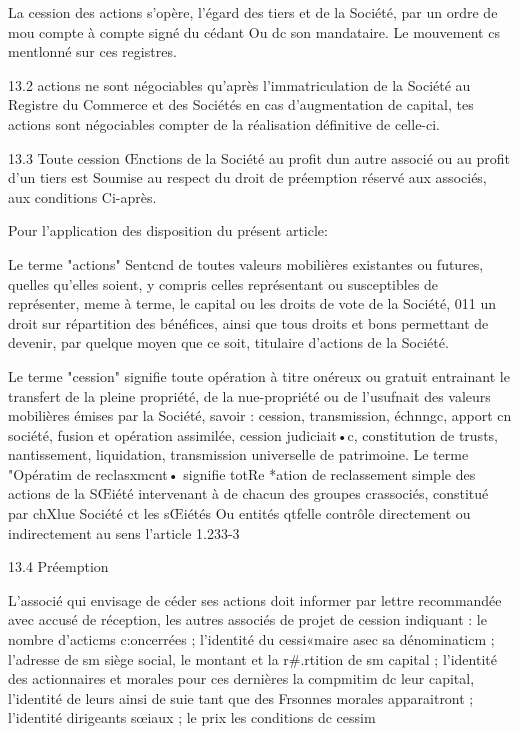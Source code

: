 \documentclass{article}
\begin{document}
La cession des actions s'opère, l'égard des tiers et de la Société, par un ordre de mou compte à compte signé du cédant Ou dc son mandataire. Le mouvement cs mentlonné sur ces registres.

13.2 actions ne sont négociables qu'après l'immatriculation de la Société au Registre du Commerce et des Sociétés en cas d'augmentation de capital, tes actions sont négociables compter de la réalisation définitive de celle-ci.

13.3 Toute cession Œnctions de la Société au profit dun autre associé ou au profit d'un tiers est Soumise au respect du droit de préemption réservé aux associés, aux conditions Ci-après.

Pour l'application des disposition du présent article:

Le terme "actions" Sentcnd de toutes valeurs mobilières existantes ou futures, quelles qu'elles soient, y compris celles représentant ou susceptibles de représenter, meme à terme, le capital ou les droits de vote de la Société, 011 un droit sur répartition des bénéfices, ainsi que tous droits et bons permettant de devenir, par quelque moyen que ce soit, titulaire d'actions de la Société.

Le terme "cession" signifie toute opération à titre onéreux ou gratuit entrainant le transfert de la pleine propriété, de la nue-propriété ou de l'usufnait des valeurs mobilières émises par la Société, savoir : cession, transmission, échnngc, apport cn société, fusion et opération assimilée, cession judiciait•c, constitution de trusts, nantissement, liquidation, transmission universelle de patrimoine. Le terme "Opératim de reclasxmcnt• signifie totRe *ation de reclassement simple des actions de la SŒiété intervenant à de chacun des groupes crassociés, constitué par chXlue Société ct les sŒiétés Ou entités qtfelle contrôle directement ou indirectement au sens l'article 1.233-3

13.4 Préemption

L'associé qui envisage de céder ses actions doit informer par lettre recommandée avec accusé de réception, les autres associés de projet de cession indiquant :
le nombre d'acticms c:oncerrées ;
l'identité du cessi«maire asec sa dénominaticm ;
l'adresse de sm siège social, le montant et la r#.rtition de sm capital ;
l'identité des actionnaires et morales pour ces dernières la
compmitim dc leur capital, l'identité de leurs ainsi de suie tant que des
Frsonnes morales apparaitront ;
l'identité dirigeants sœiaux ;
le prix les conditions dc cessim
\end{document}
